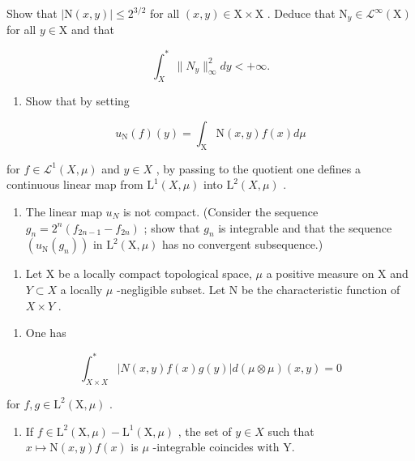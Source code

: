 Show that \(|\mathrm{N}(x,y)| \leqslant 2^{3/2}\) for all \((x,y) \in \mathrm{X} \times \mathrm{X}\) . Deduce that \(\mathrm{N}_y \in \mathcal{L}^\infty(\mathrm{X})\) for all \(y \in \mathrm{X}\) and that

\[
\int_ {X} ^ {*} \| N _ {y} \| _ {\infty} ^ {2} d y <   + \infty .
\]

\begin{enumerate}
\def\labelenumi{\alph{enumi})}
\setcounter{enumi}{2}
\tightlist
\item
  Show that by setting
\end{enumerate}

\[
u _ {\mathrm{N}} (f) (y) = \int_ {\mathrm{X}} \mathrm{N} (x, y) f (x) d \mu
\]

for \(f \in \mathcal{L}^{1}(X, \mu)\) and \(y \in X\) , by passing to the quotient one defines a continuous linear map from \(\mathrm{L}^{1}(X, \mu)\) into \(\mathrm{L}^{2}(X, \mu)\) .

\begin{enumerate}
\def\labelenumi{\alph{enumi})}
\setcounter{enumi}{3}
\tightlist
\item
  The linear map \(u_{N}\) is not compact. (Consider the sequence \(g_{n}=2^{n}(f_{2n-1}-f_{2n})\) ; show that \(g_{n}\) is integrable and that the sequence \((u_{\mathrm{N}}(g_{n}))\) in \(\mathrm{L}^{2}(\mathrm{X},\mu)\) has no convergent subsequence.)
\end{enumerate}

\begin{enumerate}
\def\labelenumi{\arabic{enumi})}
\setcounter{enumi}{2}
\tightlist
\item
  Let X be a locally compact topological space, \(\mu\) a positive measure on X and \(Y \subset X\) a locally \(\mu\) -negligible subset. Let N be the characteristic function of \(X \times Y\) .
\end{enumerate}

\begin{enumerate}
\def\labelenumi{\alph{enumi})}
\tightlist
\item
  One has
\end{enumerate}

\[
\int_ {X \times X} ^ {*} | N (x, y) f (x) g (y) | d (\mu \otimes \mu) (x, y) = 0
\]

for \(f, g \in \mathrm{L}^2(\mathrm{X}, \mu)\) .

\begin{enumerate}
\def\labelenumi{\alph{enumi})}
\setcounter{enumi}{1}
\tightlist
\item
  If \(f \in \mathrm{L}^{2}(\mathrm{X}, \mu) - \mathrm{L}^{1}(\mathrm{X}, \mu)\) , the set of \(y \in X\) such that \(x \mapsto \mathrm{N}(x, y)f(x)\) is \(\mu\) -integrable coincides with Y.
\end{enumerate}

